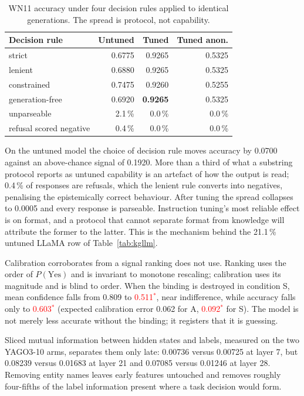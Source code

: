 \documentclass[conference]{IEEEtran}
\newcommand{\pv}[1]{\textcolor{red}{#1\ensuremath{^{\ast}}}}
\begin{document}
\begin{table}[t]
\caption{WN11 accuracy under four decision rules applied to identical
generations. The spread is protocol, not capability.}
\label{tab:parsers}
\centering
\footnotesize
\begin{tabular}{@{}lrrr@{}}
\toprule
\textbf{Decision rule} & \textbf{Untuned} & \textbf{Tuned} & \textbf{Tuned anon.} \\
\midrule
strict         & 0.6775 & 0.9265 & 0.5325 \\
lenient        & 0.6880 & 0.9265 & 0.5325 \\
constrained    & 0.7475 & 0.9260 & 0.5255 \\
generation-free & 0.6920 & \textbf{0.9265} & 0.5325 \\
\midrule
unparseable    & 2.1\,\% & 0.0\,\% & 0.0\,\% \\
refusal scored negative & 0.4\,\% & 0.0\,\% & 0.0\,\% \\
\bottomrule
\end{tabular}
\end{table}

On the untuned model the choice of decision rule moves accuracy by 0.0700
against an above-chance signal of 0.1920. More than a third of what a substring
protocol reports as untuned capability is an artefact of how the output is read;
0.4\,\% of responses are refusals, which the lenient rule converts into
negatives, penalising the epistemically correct behaviour. After tuning the
spread collapses to 0.0005 and every response is parseable. Instruction tuning's
most reliable effect is on format, and a protocol that cannot separate format
from knowledge will attribute the former to the latter. This is the mechanism
behind the 21.1\,\% untuned LLaMA row of Table~\ref{tab:kgllm}.

Calibration corroborates from a signal ranking does not use. Ranking uses the
order of $P(\text{Yes})$ and is invariant to monotone rescaling; calibration uses
its magnitude and is blind to order. When the binding is destroyed in condition
S, mean confidence falls from 0.809 to \pv{0.511}, near indifference, while
accuracy falls only to \pv{0.603} (expected calibration error \cite{guo2017}
0.062 for A, \pv{0.092} for S). The model
is not merely less accurate without the binding; it registers that it is
guessing.

Sliced mutual information between hidden states and labels, measured on the two
YAGO3-10 arms, separates them only late: 0.00736 versus 0.00725 at layer 7,
but 0.08239 versus 0.01683 at layer 21 and 0.07085 versus 0.01246 at layer 28.
Removing entity names leaves early features untouched and removes roughly
four-fifths of the label information present where a task decision would form.
\end{document}
